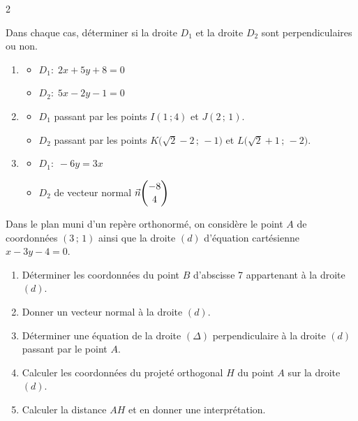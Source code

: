 \documentclass[a4paper,12pt]{article}
\begin{document}
\begin{multicols}{2}
\begin{exercice}[title=Exercice 4 $\star$ { [Représenter, Calculer] }]{}{}
  Dans chaque cas, déterminer si la droite $D_1$ et la droite $D_2$ sont perpendiculaires ou non.

  \begin{enumerate}
    \item
      \begin{itemize}[label=$\bullet$]
        \item $D_1 :\; 2x + 5y + 8 = 0$
        \item $D_2 :\; 5x - 2y - 1 = 0$
      \end{itemize}

    \item
      \begin{itemize}[label=$\bullet$]
        \item $D_1$ passant par les points $I(1\,;4)$ et $J(2\,;\,1)$.
        \item $D_2$ passant par les points $K\bigl(\sqrt{2}-2\,;\,-1\bigr)$ et $L\bigl(\sqrt{2}+1\,;\,-2\bigr)$.
      \end{itemize}

    \item
      \begin{itemize}[label=$\bullet$]
        \item $D_1 :\; -6y = 3x$
        \item $D_2$ de vecteur normal $\displaystyle \vec{n}\dbinom{-8}{4}$
      \end{itemize}

  \end{enumerate}
\end{exercice}

\begin{exercice}[title=Exercice 5 $\star\star$ { [Représenter, Calculer] }]{}{}
  Dans le plan muni d'un repère orthonormé, on considère le point $A$ de coordonnées $(3\,;\,1)$ ainsi que la droite $(d)$ d'équation cartésienne $x - 3y - 4 = 0$.
  \begin{enumerate}
    \item Déterminer les coordonnées du point $B$ d'abscisse 7 appartenant à la droite $(d)$.
    \item Donner un vecteur normal à la droite $(d)$.
    \item Déterminer une équation de la droite $(\Delta)$ perpendiculaire à la droite $(d)$ passant par le point $A$.
    \item Calculer les coordonnées du projeté orthogonal $H$ du point $A$ sur la droite $(d)$.
    \item Calculer la distance $AH$ et en donner une interprétation.
  \end{enumerate}
\end{exercice}


\end{multicols}
\end{document}
